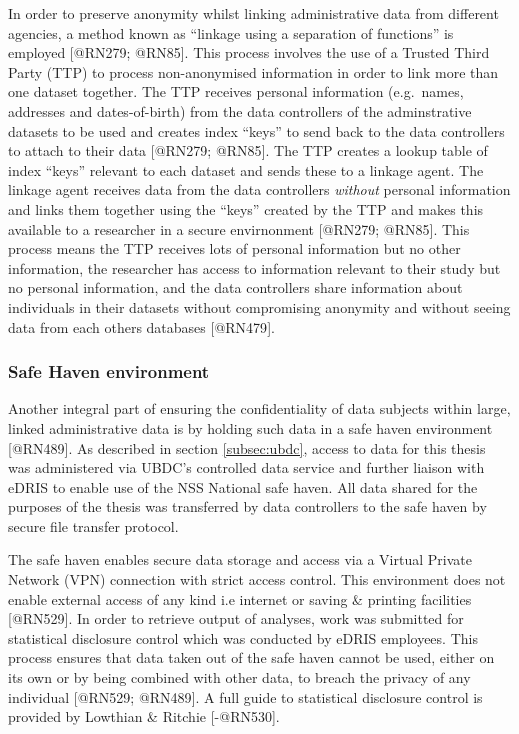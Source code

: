 \documentclass[]{article}
\begin{document}
In order to preserve anonymity whilst linking administrative data from
different agencies, a method known as ``linkage using a separation of
functions'' is employed {[}@RN279; @RN85{]}. This process involves the
use of a Trusted Third Party (TTP) to process non-anonymised information
in order to link more than one dataset together. The TTP receives
personal information (e.g.~names, addresses and dates-of-birth) from the
data controllers of the adminstrative datasets to be used and creates
index ``keys'' to send back to the data controllers to attach to their
data {[}@RN279; @RN85{]}. The TTP creates a lookup table of index
``keys'' relevant to each dataset and sends these to a linkage agent.
The linkage agent receives data from the data controllers
\textit{without} personal information and links them together using the
``keys'' created by the TTP and makes this available to a researcher in
a secure envirnonment {[}@RN279; @RN85{]}. This process means the TTP
receives lots of personal information but no other information, the
researcher has access to information relevant to their study but no
personal information, and the data controllers share information about
individuals in their datasets without compromising anonymity and without
seeing data from each others databases {[}@RN479{]}.

\subsubsection{Safe Haven environment}\label{subsec:safe-haven}

Another integral part of ensuring the confidentiality of data subjects
within large, linked administrative data is by holding such data in a
safe haven environment {[}@RN489{]}. As described in section
\ref{subsec:ubdc}, access to data for this thesis was administered via
UBDC's controlled data service and further liaison with eDRIS to enable
use of the NSS National safe haven. All data shared for the purposes of
the thesis was transferred by data controllers to the safe haven by
secure file transfer protocol.

The safe haven enables secure data storage and access via a Virtual
Private Network (VPN) connection with strict access control. This
environment does not enable external access of any kind i.e internet or
saving \& printing facilities {[}@RN529{]}. In order to retrieve output
of analyses, work was submitted for statistical disclosure control which
was conducted by eDRIS employees. This process ensures that data taken
out of the safe haven cannot be used, either on its own or by being
combined with other data, to breach the privacy of any individual
{[}@RN529; @RN489{]}. A full guide to statistical disclosure control is
provided by Lowthian \& Ritchie {[}-@RN530{]}.
\end{document}
